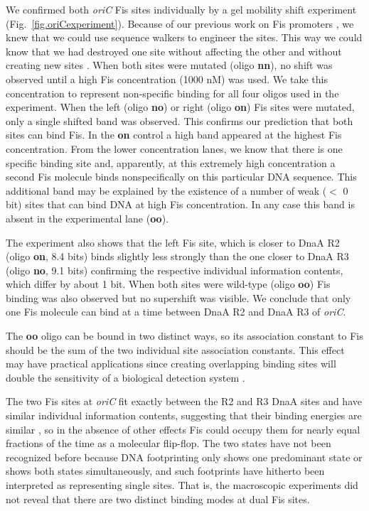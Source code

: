 \documentclass[doublespacing]{narfront}
\newcommand{\fig}[1]{Fig.~\ref{#1}} %
\newcommand{\figmargin}[1]{\marginpar{\textcolor{blue}{$\Leftarrow$Fig \ref{#1}}}}
\begin{document}
We confirmed both \emph{oriC} Fis sites individually by a gel mobility shift
experiment
(\fig{fig.oriCexperiment}).\figmargin{fig.oriCexperiment}
Because of our previous work on Fis promoters
\cite{Hengen.fisinfo},
we knew that we could use sequence walkers
\cite{Schneider.walker}
to engineer the sites.
This way we could know that we had destroyed one site without affecting
the other
and without creating new sites
\cite{Goodrich.McClure1991}.
When both sites were mutated (oligo \textbf{nn}), no shift was observed until a high
Fis concentration (1000 nM) was used.
We take this concentration to represent
non-specific binding
for all four oligos used in the experiment.
When the left (oligo \textbf{no}) or right (oligo \textbf{on}) Fis sites were
mutated, only a single shifted band was observed.
This confirms our prediction that both sites can bind Fis.
In the
\textbf{on}
control a high band appeared
at the highest
Fis concentration.
From the lower concentration lanes, we know that
there is one specific binding site
and,
apparently,
at this extremely high concentration
a second Fis molecule
binds nonspecifically
on this particular DNA sequence.
This additional band may be explained by the existence
of a number of weak ($<$ 0 bit) sites
that can bind DNA
at high Fis concentration.
In any case
this band is
absent in the experimental lane
(\textbf{oo}).

The experiment also shows that the left Fis site,
which is
closer to DnaA R2 (oligo \textbf{on}, 8.4 bits)
binds slightly less strongly than
the one
closer to DnaA R3 (oligo \textbf{no}, 9.1 bits)
confirming the respective individual information contents,
which differ by about 1 bit.
When both sites were wild-type (oligo \textbf{oo})
Fis binding was also observed but no supershift was visible.
We conclude that
only one Fis molecule can bind at a time
between DnaA R2 and DnaA R3 of \emph{oriC}.

The \textbf{oo} oligo can be bound in two distinct ways,
so its association constant to Fis should be the sum of the
two individual site association constants.
This effect may have practical applications since
creating overlapping binding sites will double the
sensitivity of a biological detection system
\cite{MOCO2004}.

The two Fis sites at \emph{oriC}
fit exactly between the R2 and R3 DnaA sites
and have similar individual
information contents, suggesting that their binding energies
are similar \cite{Schneider.edmm}, so
in the absence of other effects Fis could occupy them
for nearly equal fractions of the time as a molecular flip-flop.
The two states have not been recognized before because
DNA footprinting only shows one predominant state or shows both states
simultaneously, and such footprints have hitherto been interpreted as
representing single sites.
That is, the macroscopic experiments did not reveal that
there are two distinct binding modes at dual Fis sites.
\end{document}
